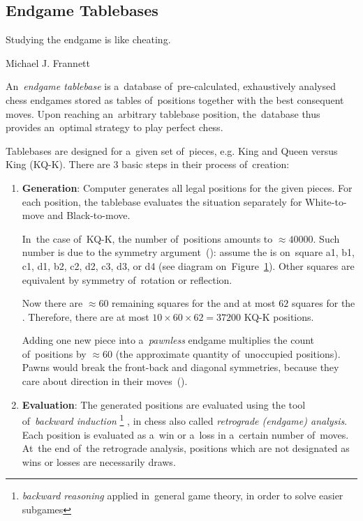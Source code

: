 \subsection{Endgame Tablebases}
\epigraph{
  Studying the endgame is like cheating.
}{Michael J. Frannett}

An~\emph{endgame tablebase} is a~database of~pre-calculated, exhaustively analysed chess endgames stored as tables of~positions together with the best consequent moves.
Upon reaching an~arbitrary tablebase position, the~database thus provides an~optimal strategy to play perfect chess.

Tablebases are designed for a~given set of~pieces, e.g. \king King and \queen Queen versus \kingB King (KQ-K).
There are 3 basic steps in their process of~creation:
\begin{enumerate}[1]
  \item \textbf{Generation}:
    Computer generates all legal positions for the given pieces.
    For each position, the tablebase evaluates the situation separately for White-to-move and Black-to-move.

    In~the case of~KQ-K, the number of~positions amounts to $\approx 40000$.
    Such number is due to the symmetry argument~(\cite{Levy2009computers}):
    assume the \kingB{} is on~square a1, b1, c1, d1, b2, c2, d2, c3, d3, or d4 (see diagram on~Figure~\ref{fig:non-symmetric-black-king}).
    Other squares are equivalent by symmetry of~rotation or reflection.

    Now there are $\approx 60$ remaining squares for the \king{} and at most $62$ squares for the \queen.
    Therefore, there are at most $10 \times 60 \times 62 = 37200$ KQ-K positions.
    \begin{figure}[H]
      \centering
      \newgame
      \showboard
      \label{fig:non-symmetric-black-king}
    \end{figure}

    Adding one new piece into a~\emph{pawnless} endgame multiplies the count of~positions by $\approx 60$ (the approximate quantity of~unoccupied positions).
    Pawns would break the front-back and diagonal symmetries, because they care about direction in their moves~(\cite{Muller2006EGTB}).

  \item \textbf{Evaluation}:
    The generated positions are evaluated using the tool of~\emph{backward induction}%
    \footnote{\emph{backward reasoning} applied in~general game theory, in order to solve easier subgames}
    , in chess also called \emph{retrograde (endgame) analysis}.
    Each position is evaluated as a~win or a~loss in a~certain number of~moves.
    At~the end of~the retrograde analysis, positions which are not designated as wins or losses are necessarily draws.


\end{enumerate}
